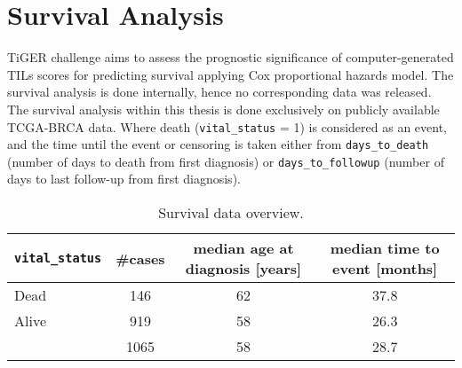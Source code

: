 \section{Survival Analysis}
TiGER challenge aims to assess the prognostic significance of computer-generated TILs scores
for predicting survival applying Cox proportional hazards model. The survival analysis
is done internally, hence no corresponding data was released. The survival analysis
within this thesis is done exclusively on publicly available TCGA-BRCA data. Where death
(\texttt{vital\_status} = 1) is considered as an event, and the time until the event or censoring is
taken either from \texttt{days\_to\_death} (number of days to death from first diagnosis) or \texttt{days\_to\_followup}
(number of days to last follow-up from first diagnosis). 
\begin{table}[h!]
\centering
\begin{tabular}{ l c c c } 
\hline
\texttt{vital\_status} & \#cases & median age at diagnosis [years] & median time to event [months]\\ 
\hline
Dead & 146 & 62 & 37.8\\ 
Alive & 919 & 58 & 26.3\\ 
\hline
 & 1065 & 58 & 28.7\\
\end{tabular}
\caption{\label{tab:surv_data}Survival data overview.}
\end{table}

